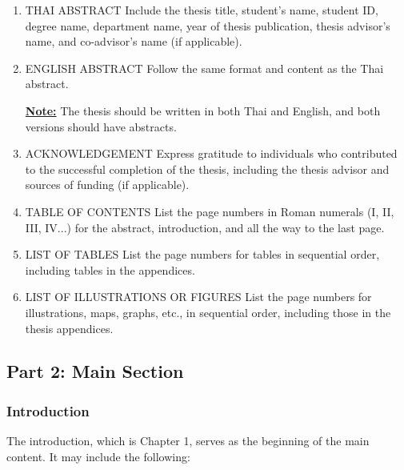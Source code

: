 \begin{enumerate}[label=\arabic*)]
    \item THAI ABSTRACT Include the thesis title, student's name, student ID, degree name, department name, year of thesis publication, thesis advisor's name, and co-advisor's name (if applicable).

    \item ENGLISH ABSTRACT Follow the same format and content as the Thai abstract.


    \textbf{\underline{Note:}} The thesis should be written in both Thai and English, and both versions should have abstracts.

\item ACKNOWLEDGEMENT Express gratitude to individuals who contributed to the successful completion of the thesis, including the thesis advisor and sources of funding (if applicable).

\item TABLE OF CONTENTS List the page numbers in Roman numerals (I, II, III, IV...) for the abstract, introduction, and all the way to the last page.

\item LIST OF TABLES List the page numbers for tables in sequential order, including tables in the appendices.

\item LIST OF ILLUSTRATIONS OR FIGURES List the page numbers for illustrations, maps, graphs, etc., in sequential order, including those in the thesis appendices.

\end{enumerate}



\subsection{Part 2: Main Section}

\subsubsection{Introduction}

The introduction, which is Chapter 1, serves as the beginning of the main content. It may include the following:

